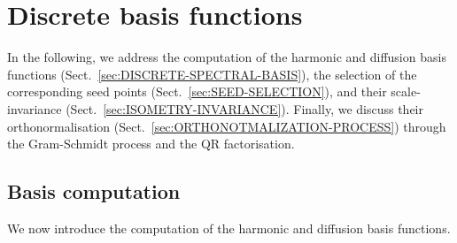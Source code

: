 \documentclass[acmtog,authorversion]{acmart}
\begin{document}
\section{Discrete basis functions\label{sec:COMPUTATION}}
In the following, we address the computation of the harmonic and diffusion basis functions (Sect.~\ref{sec:DISCRETE-SPECTRAL-BASIS}), the selection of the corresponding seed points (Sect.~\ref{sec:SEED-SELECTION}), and their scale-invariance (Sect.~\ref{sec:ISOMETRY-INVARIANCE}). Finally, we discuss their orthonormalisation (Sect.~\ref{sec:ORTHONOTMALIZATION-PROCESS}) through the Gram-Schmidt process and the QR factorisation.

\subsection{Basis computation\label{sec:DISCRETE-SPECTRAL-BASIS}}
We now introduce the computation of the harmonic and diffusion basis functions.
\end{document}
